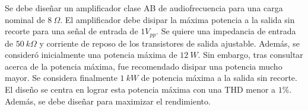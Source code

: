 Se debe diseñar un amplificador clase AB de audiofrecuencia para una carga nominal de $8 \ \Omega$. El amplificador debe disipar la máxima potencia a la salida sin recorte para una señal de entrada de $1 V_{pp}$. Se quiere una impedancia de entrada de $50 \ k\Omega$ y corriente de reposo de los transistores de salida ajustable. Además, se consideró inicialmente una potencia máxima de $12 \ W$. Sin embargo, tras consultar acerca de la potencia máxima, fue recomendado disipar una potencia mucho mayor. Se considera finalmente $1 \ kW$ de potencia máxima a la salida sin recorte. El diseño se centra en lograr esta potencia máxima con una THD menor a $1\%$. Además, se debe diseñar para maximizar el rendimiento.
